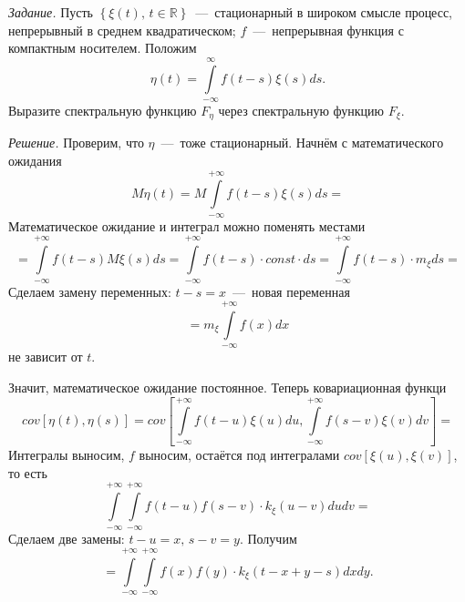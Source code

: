\textit{Задание.}
Пусть $ \left\{ \xi \left( t \right), \, t \in \mathbb{R} \right\} $~---~стационарный в широком
смысле процесс, непрерывный в среднем квадратическом;
$f$~---~непрерывная функция с компактным носителем.
Положим
\begin{equation*}
  \eta \left( t \right) =
  \int \limits_{-\infty }^{ \infty } f \left( t - s \right) \xi \left( s \right) ds.
\end{equation*}
Выразите спектральную функцию $F_{ \eta }$ через спектральную функцию $F_{ \xi }$.

\textit{Решение.}
Проверим, что $ \eta $~---~тоже стационарный.
Начнём с математического ожидания
\begin{equation*}
  M \eta \left( t \right) =
  M \int \limits_{-\infty }^{+\infty } f \left( t - s \right) \xi \left( s \right) ds =
\end{equation*}
Математическое ожидание и интеграл можно поменять местами
\begin{equation*}
  = \int \limits_{-\infty }^{+\infty } f \left( t - s \right) M \xi \left( s \right) ds =
  \int \limits_{-\infty }^{+\infty } f \left( t - s \right) \cdot const \cdot ds =
  \int \limits_{-\infty }^{+\infty } f \left( t - s \right) \cdot m_{ \xi } ds =
\end{equation*}
Сделаем замену переменных: $t - s = x$~---~новая переменная
\begin{equation*}
  = m_{ \xi } \int \limits_{-\infty }^{+\infty } f \left( x \right) dx
\end{equation*}
не зависит от $t$.

Значит, математическое ожидание постоянное.
Теперь ковариационная функци
\begin{equation*}
  cov \left[ \eta \left( t \right), \eta \left( s \right) \right] =
  cov \left[
    \int \limits_{-\infty }^{+\infty } f \left( t - u \right) \xi \left( u \right) du,
    \int \limits_{-\infty }^{+\infty } f \left( s - v \right) \xi \left( v \right) dv \right] =
\end{equation*}
Интегралы выносим, $f$ выносим,
остаётся под интегралами $cov \left[ \xi \left( u \right), \xi \left( v \right) \right] $, то есть
\begin{equation*}
  \int \limits_{-\infty }^{+\infty }
    \int \limits_{-\infty }^{+\infty }
      f \left( t - u \right) f \left( s - v \right) \cdot k_{ \xi } \left( u - v \right) dudv =
\end{equation*}
Сделаем две замены: $t - u = x, \, s - v = y$.
Получим
\begin{equation*}
  = \int \limits_{-\infty }^{+\infty }
    \int \limits_{-\infty }^{+\infty }
      f \left( x \right) f \left( y \right) \cdot
      k_{ \xi } \left( t - x + y - s \right)
    dx
  dy.
\end{equation*}

